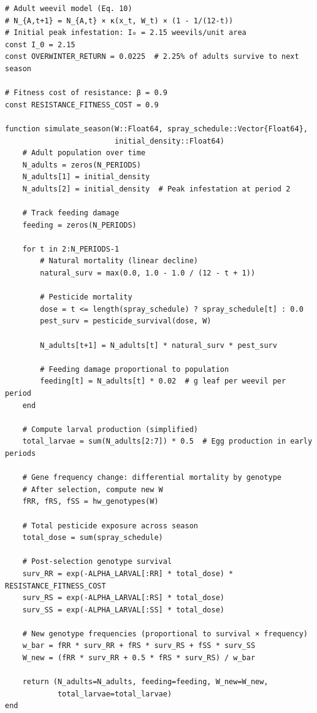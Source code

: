 \begin{verbatim}
# Adult weevil model (Eq. 10)
# N_{A,t+1} = N_{A,t} × κ(x_t, W_t) × (1 - 1/(12-t))
# Initial peak infestation: I₀ = 2.15 weevils/unit area
const I_0 = 2.15
const OVERWINTER_RETURN = 0.0225  # 2.25% of adults survive to next season

# Fitness cost of resistance: β = 0.9
const RESISTANCE_FITNESS_COST = 0.9

function simulate_season(W::Float64, spray_schedule::Vector{Float64},
                         initial_density::Float64)
    # Adult population over time
    N_adults = zeros(N_PERIODS)
    N_adults[1] = initial_density
    N_adults[2] = initial_density  # Peak infestation at period 2

    # Track feeding damage
    feeding = zeros(N_PERIODS)

    for t in 2:N_PERIODS-1
        # Natural mortality (linear decline)
        natural_surv = max(0.0, 1.0 - 1.0 / (12 - t + 1))

        # Pesticide mortality
        dose = t <= length(spray_schedule) ? spray_schedule[t] : 0.0
        pest_surv = pesticide_survival(dose, W)

        N_adults[t+1] = N_adults[t] * natural_surv * pest_surv

        # Feeding damage proportional to population
        feeding[t] = N_adults[t] * 0.02  # g leaf per weevil per period
    end

    # Compute larval production (simplified)
    total_larvae = sum(N_adults[2:7]) * 0.5  # Egg production in early periods

    # Gene frequency change: differential mortality by genotype
    # After selection, compute new W
    fRR, fRS, fSS = hw_genotypes(W)

    # Total pesticide exposure across season
    total_dose = sum(spray_schedule)

    # Post-selection genotype survival
    surv_RR = exp(-ALPHA_LARVAL[:RR] * total_dose) * RESISTANCE_FITNESS_COST
    surv_RS = exp(-ALPHA_LARVAL[:RS] * total_dose)
    surv_SS = exp(-ALPHA_LARVAL[:SS] * total_dose)

    # New genotype frequencies (proportional to survival × frequency)
    w_bar = fRR * surv_RR + fRS * surv_RS + fSS * surv_SS
    W_new = (fRR * surv_RR + 0.5 * fRS * surv_RS) / w_bar

    return (N_adults=N_adults, feeding=feeding, W_new=W_new,
            total_larvae=total_larvae)
end
\end{verbatim}




